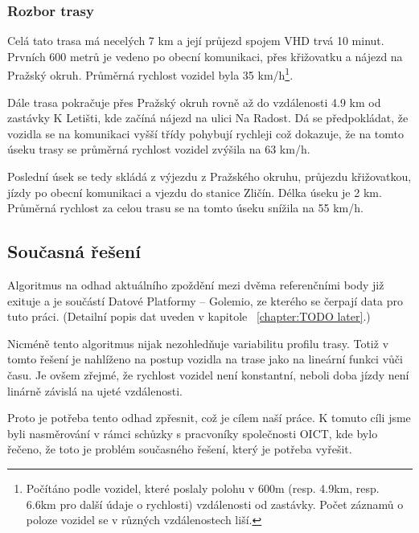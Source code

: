 \subsubsection{Rozbor trasy}

Celá tato trasa má necelých 7 km a její průjezd spojem VHD trvá 10 minut. Prvních 600 metrů je vedeno po obecní komunikaci, přes křižovatku a nájezd na Pražský okruh. Průměrná rychlost vozidel byla 35 km/h\footnote{Počítáno podle vozidel, které poslaly polohu v 600m (resp. 4.9km, resp. 6.6km pro další údaje o rychlosti) vzdálenosti od zastávky. Počet záznamů o poloze vozidel se v různých vzdálenostech liší.}.

\bigbreak

Dále trasa pokračuje přes Pražský okruh rovně až do vzdálenosti 4.9 km od zastávky K Letišti, kde začíná nájezd na ulici Na Radost. Dá se předpokládat, že vozidla se na komunikaci vyšší třídy pohybují rychleji což dokazuje, že na tomto úseku trasy se průměrná rychlost vozidel zvýšila na 63 km/h.

\bigbreak

Poslední úsek se tedy skládá z výjezdu z Pražského okruhu, průjezdu křižovatkou, jízdy po obecní komunikaci a vjezdu do stanice Zličín. Délka úseku je 2 km. Průměrná rychlost za celou trasu se na tomto úseku snížila na 55 km/h.


\subsection{Současná řešení}

Algoritmus na odhad aktuálního zpoždění mezi dvěma referenčními body již exituje a je součástí Datové Platformy -- Golemio, ze kterého se čerpají data pro tuto práci. (Detailní popis dat uveden v kapitole ~\ref{chapter:TODO later}.)

\bigbreak

Nicméně tento algoritmus nijak nezohledňuje variabilitu profilu trasy. Totiž v tomto řešení je nahlíženo na postup vozidla na trase jako na lineární funkci vůči času. Je ovšem zřejmé, že rychlost vozidel není konstantní, neboli doba jízdy není linárně závislá na ujeté vzdálenosti.

\bigbreak

Proto je potřeba tento odhad zpřesnit, což je cílem naší práce. K tomuto cíli jsme byli nasměrování v rámci schůzky s pracvoníky společnosti OICT, kde bylo řečeno, že toto je problém současného řešení, který je potřeba vyřešit.



